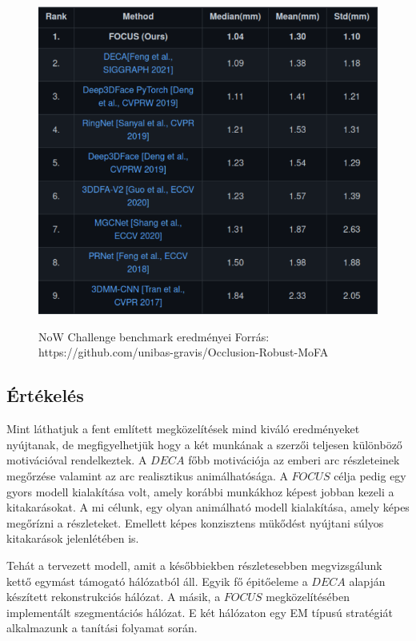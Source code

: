 \documentclass[12pt,a4]{article}
\begin{document}
 	\begin{figure}[h]	
 		\centering
 		\includegraphics[width=1\linewidth]{now}
 		\label{fig:now}
 		\caption{NoW Challenge benchmark eredményei
 			Forrás: https://github.com/unibas-gravis/Occlusion-Robust-MoFA}
 	\end{figure}
 	
 	\subsection{Értékelés}
 	
 	Mint láthatjuk a fent említett megközelítések mind kiváló eredményeket
 	nyújtanak, de megfigyelhetjük hogy a két munkának a szerzői teljesen
 	különböző motivációval rendelkeztek.
 	A $DECA$ főbb motivációja az emberi arc részleteinek megőrzése valamint az arc realisztikus animálhatósága. A
 	$FOCUS$ célja pedig egy gyors modell kialakítása volt, amely korábbi
 	munkákhoz képest jobban kezeli a kitakarásokat. A mi célunk, egy olyan
 	animálható modell kialakítása, amely képes megőrízni a részleteket. Emellett képes konzisztens mükődést nyújtani súlyos kitakarások jelenlétében is.
 	
 	Tehát a tervezett modell, amit a későbbiekben részletesebben
 	megvizsgálunk kettő egymást támogató hálózatból áll. Egyik fő épitőeleme a
    $DECA$ alapján készített rekonstrukciós hálózat. A másik,
 	a $FOCUS$ megközelítésében implementált szegmentációs hálózat. E két
 	hálózaton egy EM típusú stratégiát alkalmazunk a tanítási folyamat
 	során.
 	
\end{document}
